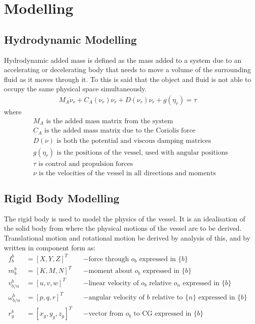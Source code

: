 \chapter{Modelling}

\section{Hydrodynamic Modelling}
Hydrodynamic added mass is defined as the mass added to a system due to an accelerating or decelerating body that needs to move a volume of the surrounding fluid as it moves through it. To this is said that the object and fluid is not able to occupy the same physical space simultaneously.
\begin{align}
M_A \dot \nu_r + C_A(\nu_r)\nu_r + D(\nu_r)\nu_r + g(\eta_r) = \tau
\label{eq:hydmodel}
\end{align}
where
\begin{align}
&M_A \text{ is the added mass matrix from the system}\nonumber\\
&C_A \text{ is the added mass matrix due to the Coriolis force}\nonumber\\
&D(\nu) \text{ is both the potential and viscous damping matrices}\nonumber\\
&g(\eta_r) \text{ is the positions of the vessel, used with angular positions}\nonumber\\
&\tau \text{ is control and propulsion forces}\nonumber\\
&\nu \text{ is the velocities of the vessel in all directions and moments}
\end{align}

\section{Rigid Body Modelling}
The rigid body is used to model the physics of the vessel. It is an idealisation of the solid body from where the physical motions of the vessel are to be derived. Translational motion and rotational motion be derived by analysis of this, and by \citep{fossen} written in component form as:
\begin{align}
f^b_b &= [X,Y,Z]^T & &- \text{force through } o_b \text{ expressed in } \{b\}\\
m^b_b &= [K,M,N]^T & &- \text{moment about } o_b \text{ expressed in } \{b\}\\
v^b_{b/n} &= [u,v,w]^T & &- \text{linear velocity of } o_b \text{ relative } o_n \text{ expressed in } \{b\}\\
\omega^b_{b/n} &= [p,q,r]^T & &- \text{angular velocity of } {b} \text{ relative to } \{n\} \text{ expressed in } \{b\}\\
r^b_g &= [x_g,y_g,z_g]^T & &- \text{vector from } o_b \text{ to CG expressed in } \{b\}
\end{align}


